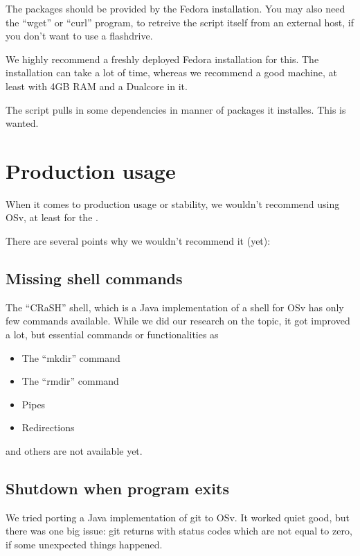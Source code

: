     The packages should be provided by the Fedora installation. You may also
    need the ``wget'' or ``curl'' program, to retreive the script itself from an
    external host, if you don't want to use a flashdrive.

    We highly recommend a freshly deployed Fedora installation for this. The
    installation can take a lot of time, whereas we recommend a good machine, at
    least with 4GB RAM and a Dualcore in it.

    The script pulls in some dependencies in manner of packages it installes.
    This is wanted.

\chapter{Production usage}

    When it comes to production usage or stability, we wouldn't recommend using
    OSv, at least for the \HFU.

    There are several points why we wouldn't recommend it (yet):

    \section{Missing shell commands}

        The ``CRaSH'' shell, which is a Java implementation of a shell for OSv
        has only few commands available. While we did our research on the topic,
        it got improved a lot, but essential commands or functionalities as

            \begin{itemize}
                \item The ``mkdir'' command
                \item The ``rmdir'' command
                \item Pipes
                \item Redirections
            \end{itemize}

        and others are not available yet.

    \section{Shutdown when program exits}

        We tried porting a Java implementation of git to OSv. It worked quiet
        good, but there was one big issue: git returns with status codes which
        are not equal to zero, if some unexpected things happened.

